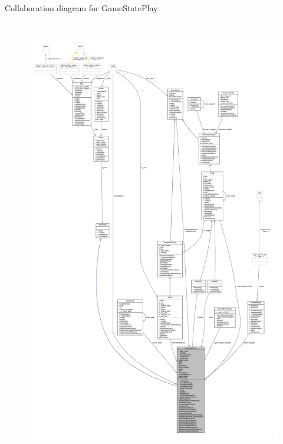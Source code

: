 Collaboration diagram for Game\+State\+Play\+:
\nopagebreak
\begin{figure}[H]
\begin{center}
\leavevmode
\includegraphics[height=550pt]{class_game_state_play__coll__graph}
\end{center}
\end{figure}
